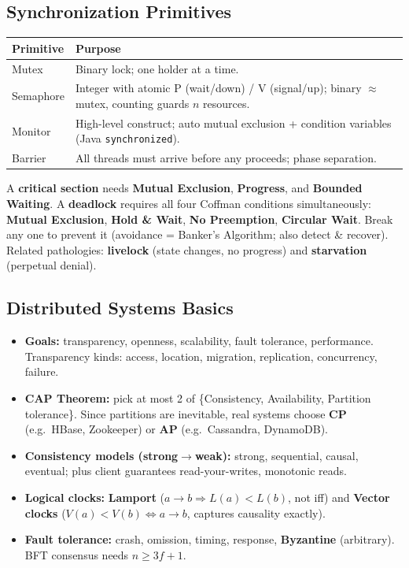 \documentclass[11pt,a4paper]{article}
\begin{document}
\subsection{Synchronization Primitives}
\begin{longtable}{@{}p{3.0cm}p{10.6cm}@{}}
\toprule
\rowcolor{primary!15}
\textbf{Primitive} & \textbf{Purpose} \\
\midrule
\endhead
Mutex & Binary lock; one holder at a time. \\
Semaphore & Integer with atomic P (wait/down) / V (signal/up); binary $\approx$ mutex, counting guards $n$ resources. \\
Monitor & High-level construct; auto mutual exclusion + condition variables (Java \texttt{synchronized}). \\
Barrier & All threads must arrive before any proceeds; phase separation. \\
\bottomrule
\end{longtable}

\begin{alertbox}
A \textbf{critical section} needs \textbf{Mutual Exclusion}, \textbf{Progress}, and \textbf{Bounded Waiting}. A \textbf{deadlock} requires all four Coffman conditions simultaneously: \textbf{Mutual Exclusion}, \textbf{Hold \& Wait}, \textbf{No Preemption}, \textbf{Circular Wait}. Break any one to prevent it (avoidance = Banker's Algorithm; also detect \& recover). Related pathologies: \textbf{livelock} (state changes, no progress) and \textbf{starvation} (perpetual denial).
\end{alertbox}

\subsection{Distributed Systems Basics}
\begin{itemize}[leftmargin=*, itemsep=2pt]
  \item \textbf{Goals:} transparency, openness, scalability, fault tolerance, performance. Transparency kinds: access, location, migration, replication, concurrency, failure.
  \item \textbf{CAP Theorem:} pick at most 2 of \{Consistency, Availability, Partition tolerance\}. Since partitions are inevitable, real systems choose \textbf{CP} (e.g.\ HBase, Zookeeper) or \textbf{AP} (e.g.\ Cassandra, DynamoDB).
  \item \textbf{Consistency models (strong$\to$weak):} strong, sequential, causal, eventual; plus client guarantees read-your-writes, monotonic reads.
  \item \textbf{Logical clocks:} \textbf{Lamport} ($a\to b \Rightarrow L(a){<}L(b)$, not iff) and \textbf{Vector clocks} ($V(a){<}V(b) \Leftrightarrow a\to b$, captures causality exactly).
  \item \textbf{Fault tolerance:} crash, omission, timing, response, \textbf{Byzantine} (arbitrary). BFT consensus needs $n \ge 3f+1$.
\end{itemize}
\end{document}
